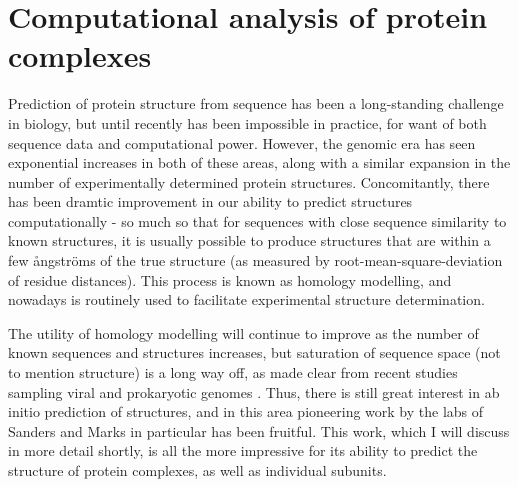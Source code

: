 \documentclass[a4paper,11pt,twoside,openright]{scrbook}
\begin{document}
\clearpage
\section{Computational analysis of protein complexes}

Prediction of protein structure from sequence has been a long-standing challenge in biology, but until recently has been impossible in practice, for want of both sequence data and computational power. However, the genomic era has seen exponential increases in both of these areas, along with a similar expansion in the number of experimentally determined protein structures. Concomitantly, there has been dramtic improvement in our ability to predict structures computationally - so much so that for sequences with close sequence similarity to known structures, it is usually possible to produce structures that are within a few ångströms of the true structure (as measured by root-mean-square-deviation of residue distances). This process is known as homology modelling, and nowadays is routinely used to facilitate experimental structure determination.

The utility of homology modelling will continue to improve as the number of known sequences and structures increases, but saturation of sequence space (not to mention structure) is a long way off, as made clear from recent studies sampling viral and prokaryotic genomes \cite{Brum2016,Shi2016,Mukherjee2017}. Thus, there is still great interest in ab initio prediction of structures, and in this area pioneering work by the labs of Sanders and Marks in particular has been fruitful. This work, which I will discuss in more detail shortly, is all the more impressive for its ability to predict the structure of protein complexes, as well as individual subunits.
\end{document}
